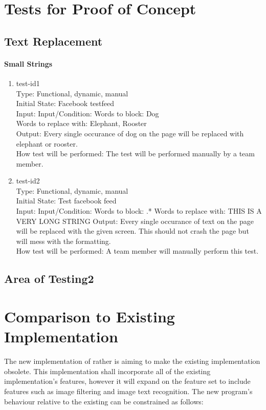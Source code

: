 \documentclass[12pt, titlepage]{article}
\begin{document}
\begin{enumerate}
\section{Tests for Proof of Concept}
\subsection{Text Replacement}
\paragraph{Small Strings}
\begin{enumerate}
\item{test-id1\\}
Type: Functional, dynamic, manual	 \\		
Initial State: Facebook testfeed	\\
Input: Input/Condition: Words to block: Dog \\
Words to replace with: Elephant, Rooster \\
Output: Every single occurance of dog on the page will be replaced with elephant or rooster. \\
How test will be performed: The test will be performed manually by a team member.
\item{test-id2\\}
Type: Functional, dynamic, manual \\
Initial State: Test facebook feed \\
Input: Input/Condition: Words to block: .*
Words to replace with: THIS IS A VERY LONG STRING
Output: Every single occurance of text on the page will be replaced with the given screen. This should not crash the page but will mess with the formatting. \\
How test will be performed: A team member will manually perform this test.
\end{enumerate}
\subsection{Area of Testing2}
\section{Comparison to Existing Implementation}
The new implementation of rather is aiming to make the existing implementation obsolete. This implementation shall incorporate all of the existing implementation's features, however it will expand on the feature set to include features such as image filtering and image text recognition. The new program's behaviour relative to the existing can be constrained as follows: \\


\end{enumerate}
\end{document}
